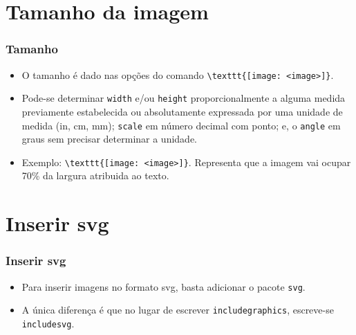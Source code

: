 \documentclass{beamer}
\begin{document}
\section{Tamanho da imagem}
\begin{frame}[fragile]
    \frametitle{Tamanho}

    \begin{itemize}
        \item O tamanho é dado nas opções do comando \lstinline[style=myStyleLatex]!\texttt{[image: <image>]}!.
        \item Pode-se determinar \texttt{width} e/ou \texttt{height} proporcionalmente a alguma medida previamente estabelecida ou absolutamente expressada por uma unidade de medida (in, cm, mm); \texttt{scale} em número decimal com ponto; e, o \texttt{angle} em graus sem precisar determinar a unidade.
        \item Exemplo: \lstinline[style=myStyleLatex]!\texttt{[image: <image>]}!. Representa que a imagem vai ocupar 70\% da largura atribuida ao texto.
    \end{itemize}

\end{frame}

\section{Inserir svg}
\begin{frame}
    \frametitle{Inserir svg}

    \begin{itemize}
        \item Para inserir imagens no formato svg, basta adicionar o pacote \texttt{svg}.
        \item A única diferença é que no lugar de escrever \texttt{includegraphics}, escreve-se \texttt{includesvg}.
    \end{itemize}

\end{frame}
\end{document}

